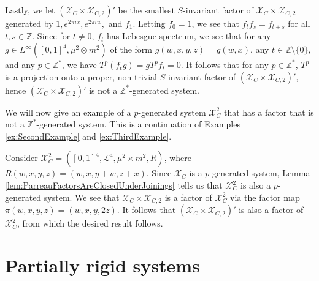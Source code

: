 \documentclass[graybox]{svmult}
\theoremstyle{definition}
\begin{document}
\begin{example}
    Lastly, we let $(\mathcal{X}_C\times\mathcal{X}_{C,2})'$ be the smallest $S$-invariant factor of $\mathcal{X}_C\times\mathcal{X}_{C,2}$ generated by $1, e^{2\pi ix}, e^{2\pi iw},$ and $f_1$.
    Letting $f_0 = 1$, we see that $f_tf_s = f_{t+s}$ for all $t,s \in \mathbb{Z}$.
    Since for $t\neq 0$, $f_t$ has Lebesgue spectrum, we see that for any $g \in L^\infty([0,1]^4,\mu^2\otimes m^2)$ of the form $g(w,x,y,z) = g(w,x)$, any $t \in \mathbb{Z}\setminus\{0\}$, and any $p \in \mathbb{Z}^*$, we have $T^p(f_tg) = gT^pf_t = 0$.
    It follows that for any $p \in \mathbb{Z}^*$, $T^p$ is a projection onto a proper, non-trivial $S$-invariant factor of $(\mathcal{X}_C\times\mathcal{X}_{C,2})'$, hence $(\mathcal{X}_C\times\mathcal{X}_{C,2})'$ is not a $\mathbb{Z}^*$-generated system.
\end{example}

\begin{example}\label{ex:FourthExample}
    We will now give an example of a $p$-generated system $\mathcal{X}_C^2$ that has a factor that is not a $\mathbb{Z}^*$-generated system.
    This is a continuation of Examples \ref{ex:SecondExample} and \ref{ex:ThirdExample}.
    
    Consider $\mathcal{X}_C^2 = ([0,1]^4,\mathscr{L}^4,\mu^2\times m^2,R)$, where $R(w,x,y,z) = (w,x,y+w,z+x)$.
    Since $\mathcal{X}_C$ is a $p$-generated system, Lemma \ref{lem:ParreauFactorsAreClosedUnderJoinings} tells us that $\mathcal{X}_C^2$ is also a $p$-generated system.
    We see that $\mathcal{X}_C\times\mathcal{X}_{C,2}$ is a factor of $\mathcal{X}_C^2$ via the factor map 
    $\pi(w,x,y,z) = (w,x,y,2z)$.
    It follows that $(\mathcal{X}_C\times\mathcal{X}_{C,2})'$ is also a factor of $\mathcal{X}_C^2$, from which the desired result follows.
\end{example}
\section{Partially rigid systems}\label{sec:PartialRigidity}
\end{document}
